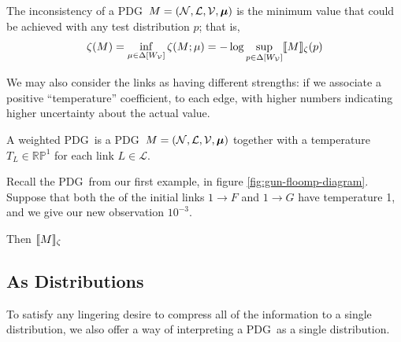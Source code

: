 \documentclass{article}
\newcommand\changeoff{\color{black} }
\newcommand{\MN}{PDG}%
\newcommand\bmu{\boldsymbol{\mu}}
\begin{document}
	\begin{defn}
		The inconsistency of a \MN\ $M = (\cal N, L, V, \bmu)$ is the minimum value that could be achieved with any test distribution $p$; that is, 
		\[ \zeta(M) = \inf_{ \mu \in \Delta [W_{\cal V}]} \zeta (M; \mu) 
			= -\log \sup_{p \in \Delta[W_{\cal V}]} \llbracket M\rrbracket_\zeta (p) \]
		
	\end{defn}


	We may also consider the links as having different strengths: if we associate a positive ``temperature'' coefficient, to each edge, with higher numbers indicating higher uncertainty about the actual value.
	
	\begin{defn}
		A weighted \MN\ is a \MN\ $M = (\cal N, L, V, \bmu)$ together with a temperature $T_L \in \mathbb {RP}^1$ for each link $L \in \mathcal L$.
	\end{defn}


	\begin{example}[continues=ex:guns-and-floomps]
		Recall the \MN\ from our first example, in figure \ref{fig:gun-floomp-diagram}. Suppose that both the of the initial links $1 \to F$ and $1\to G$ have temperature 1, and we give our new observation $10^{-3}$.
		
		Then $\llbracket M\rrbracket_\zeta$
	\end{example}
	
	
	
	\changeoff
	
	\subsection{As Distributions}
	
	
	To satisfy any lingering desire to compress all of the information to a single distribution, we also offer a way of interpreting a \MN\ as a single distribution.
	
\end{document}
